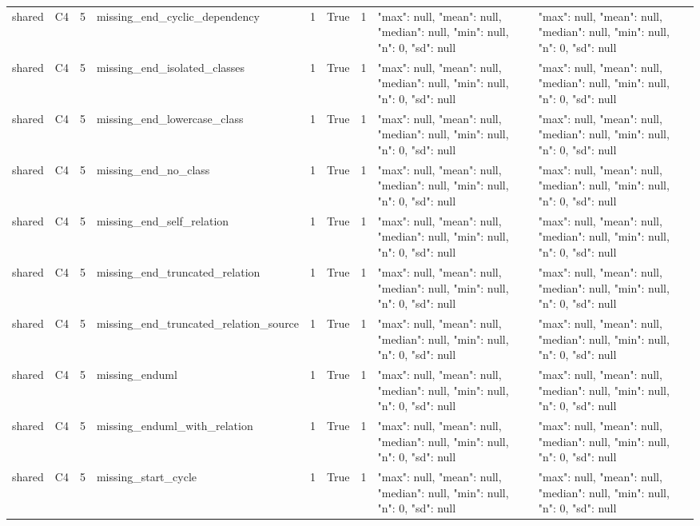 \begin{tabular}{lllllllll}
shared & C4 & 5 & missing\_end\_cyclic\_dependency & 1 & True & 1 & {"max": null, "mean": null, "median": null, "min": null, "n": 0, "sd": null} & {"max": null, "mean": null, "median": null, "min": null, "n": 0, "sd": null} \\
shared & C4 & 5 & missing\_end\_isolated\_classes & 1 & True & 1 & {"max": null, "mean": null, "median": null, "min": null, "n": 0, "sd": null} & {"max": null, "mean": null, "median": null, "min": null, "n": 0, "sd": null} \\
shared & C4 & 5 & missing\_end\_lowercase\_class & 1 & True & 1 & {"max": null, "mean": null, "median": null, "min": null, "n": 0, "sd": null} & {"max": null, "mean": null, "median": null, "min": null, "n": 0, "sd": null} \\
shared & C4 & 5 & missing\_end\_no\_class & 1 & True & 1 & {"max": null, "mean": null, "median": null, "min": null, "n": 0, "sd": null} & {"max": null, "mean": null, "median": null, "min": null, "n": 0, "sd": null} \\
shared & C4 & 5 & missing\_end\_self\_relation & 1 & True & 1 & {"max": null, "mean": null, "median": null, "min": null, "n": 0, "sd": null} & {"max": null, "mean": null, "median": null, "min": null, "n": 0, "sd": null} \\
shared & C4 & 5 & missing\_end\_truncated\_relation & 1 & True & 1 & {"max": null, "mean": null, "median": null, "min": null, "n": 0, "sd": null} & {"max": null, "mean": null, "median": null, "min": null, "n": 0, "sd": null} \\
shared & C4 & 5 & missing\_end\_truncated\_relation\_source & 1 & True & 1 & {"max": null, "mean": null, "median": null, "min": null, "n": 0, "sd": null} & {"max": null, "mean": null, "median": null, "min": null, "n": 0, "sd": null} \\
shared & C4 & 5 & missing\_enduml & 1 & True & 1 & {"max": null, "mean": null, "median": null, "min": null, "n": 0, "sd": null} & {"max": null, "mean": null, "median": null, "min": null, "n": 0, "sd": null} \\
shared & C4 & 5 & missing\_enduml\_with\_relation & 1 & True & 1 & {"max": null, "mean": null, "median": null, "min": null, "n": 0, "sd": null} & {"max": null, "mean": null, "median": null, "min": null, "n": 0, "sd": null} \\
shared & C4 & 5 & missing\_start\_cycle & 1 & True & 1 & {"max": null, "mean": null, "median": null, "min": null, "n": 0, "sd": null} & {"max": null, "mean": null, "median": null, "min": null, "n": 0, "sd": null} \\

\end{tabular}
